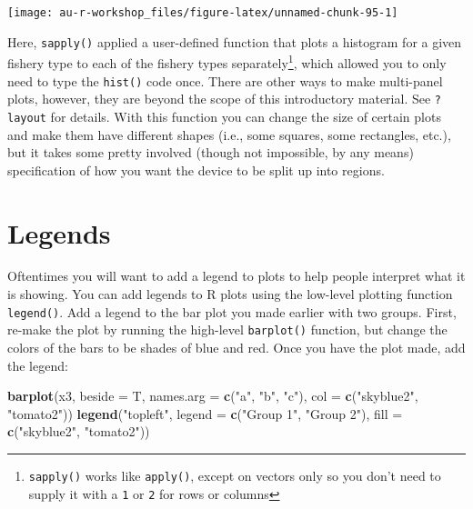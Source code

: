 \documentclass[]{book}
\newenvironment{Shaded}{\begin{snugshade}}{\end{snugshade}}
\newcommand{\KeywordTok}[1]{\textcolor[rgb]{0.13,0.29,0.53}{\textbf{#1}}}
\newcommand{\DataTypeTok}[1]{\textcolor[rgb]{0.13,0.29,0.53}{#1}}
\newcommand{\StringTok}[1]{\textcolor[rgb]{0.31,0.60,0.02}{#1}}
\newcommand{\NormalTok}[1]{#1}
\let\rmarkdownfootnote\footnote%
\def\footnote{\protect\rmarkdownfootnote}
\theoremstyle{definition}
\theoremstyle{definition}
\theoremstyle{definition}
\theoremstyle{remark}
\begin{document}
\begin{center}\texttt{[image: au-r-workshop\_files/figure-latex/unnamed-chunk-95-1]} \end{center}

Here, \texttt{sapply()} applied a user-defined function that plots a
histogram for a given fishery type to each of the fishery types
separately\footnote{\texttt{sapply()} works like \texttt{apply()},
  except on vectors only so you don't need to supply it with a
  \texttt{1} or \texttt{2} for rows or columns}, which allowed you to
only need to type the \texttt{hist()} code once. There are other ways to
make multi-panel plots, however, they are beyond the scope of this
introductory material. See \texttt{?layout} for details. With this
function you can change the size of certain plots and make them have
different shapes (i.e., some squares, some rectangles, etc.), but it
takes some pretty involved (though not impossible, by any means)
specification of how you want the device to be split up into regions.

\section{Legends}\label{legends}

Oftentimes you will want to add a legend to plots to help people
interpret what it is showing. You can add legends to R plots using the
low-level plotting function \texttt{legend()}. Add a legend to the bar
plot you made earlier with two groups. First, re-make the plot by
running the high-level \texttt{barplot()} function, but change the
colors of the bars to be shades of blue and red. Once you have the plot
made, add the legend:

\begin{Shaded}
\begin{Highlighting}[]
\KeywordTok{barplot}\NormalTok{(x3, }\DataTypeTok{beside =}\NormalTok{ T, }
        \DataTypeTok{names.arg =} \KeywordTok{c}\NormalTok{(}\StringTok{"a"}\NormalTok{, }\StringTok{"b"}\NormalTok{, }\StringTok{"c"}\NormalTok{),}
        \DataTypeTok{col =} \KeywordTok{c}\NormalTok{(}\StringTok{"skyblue2"}\NormalTok{, }\StringTok{"tomato2"}\NormalTok{))}
\KeywordTok{legend}\NormalTok{(}\StringTok{"topleft"}\NormalTok{, }\DataTypeTok{legend =} \KeywordTok{c}\NormalTok{(}\StringTok{"Group 1"}\NormalTok{, }\StringTok{"Group 2"}\NormalTok{),}
       \DataTypeTok{fill =} \KeywordTok{c}\NormalTok{(}\StringTok{"skyblue2"}\NormalTok{, }\StringTok{"tomato2"}\NormalTok{))}
\end{Highlighting}
\end{Shaded}
\end{document}
